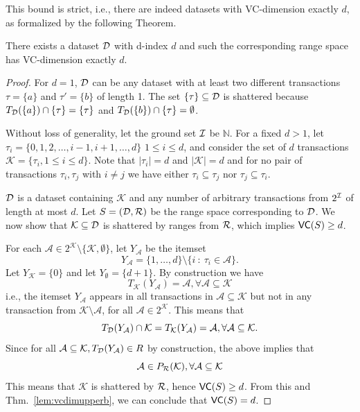 This bound is strict, i.e., there are indeed datasets with VC-dimension exactly
$d$, as formalized by the following Theorem.

\begin{theorem}\label{lem:vcdimlowerb}
  There exists a dataset ${\cal D}$ with d-index $d$ and such the corresponding range
  space has VC-dimension exactly $d$.
\end{theorem}

\begin{proof}
  For $d=1$, ${\cal D}$ can be any dataset with at least two different transactions
  $\tau=\{a\}$ and $\tau'=\{b\}$ of length 1. The set $\{\tau\}\subseteq{\cal D}$ is
  shattered because $T_{\cal D}(\{a\})\cap\{\tau\}=\{\tau\}$ and
  $T_{\cal D}(\{b\})\cap\{\tau\}=\emptyset$.

  Without loss of generality, let the ground set ${\cal I}$ be $\mathbb{N}$. For a
  fixed $d>1$, let $\tau_i=\{0,1,2,\dots,i-1,i+1,\dots,d\}$
  $1\le i\le d$, and consider the set of $d$ transactions $\mathcal{K}=\{\tau_i,
  1\le i\le d\}$.  Note that $|\tau_i|=d$ and $|\mathcal{K}|=d$ and for no pair
  of transactions $\tau_i,\tau_j$ with $i\neq j$ we have either
  $\tau_i\subseteq\tau_j$ nor $\tau_j\subseteq\tau_i$.
  
  ${\cal D}$ is a dataset containing $\mathcal{K}$ and any number of arbitrary
  transactions from $2^{\cal I}$ of length at most $d$. Let $S=({\cal D},\mathcal{R})$ be the range
  space corresponding to ${\cal D}$. We now show that $\mathcal{K}\subseteq {\cal D}$ is
  shattered by ranges from $\mathcal{R}$, which implies
  $\mathsf{VC}(S)\ge d$. 
  
  For each $\mathcal{A}\in 2^\mathcal{K}\setminus\{\mathcal{K},\emptyset\}$, let
  $Y_\mathcal{A}$ be the itemset 
  \[ 
  Y_\mathcal{A}=\{1,\dots,d\}\setminus \{i ~:~
  \tau_i \in \mathcal{A}\}.
  \]
  Let $Y_\mathcal{K}=\{0\}$ and let $Y_\emptyset=\{d+1\}$. By construction we
  have
  \[
  T_\mathcal{K}(Y_\mathcal{A})=\mathcal{A}, \forall \mathcal{A}\subseteq\mathcal{K}
  \]
  i.e., the itemset $Y_\mathcal{A}$ appears in all transactions in $\mathcal{A}\subseteq \mathcal{K}$
  but not in any transaction from $\mathcal{K}\setminus\mathcal{A}$, for all $\mathcal{A}\in 2^{\mathcal{K}}$. This means that
  \[
  T_{\cal D}(Y_\mathcal{A})\cap \mathcal{K} = T_\mathcal{K}(Y_\mathcal{A}) =
  \mathcal{A}, \forall \mathcal{A}\subseteq\mathcal{K}.
  \]
  Since for all $\mathcal{A}\subseteq\mathcal{K}, T_{\cal D}(Y_\mathcal{A})\in R$ by
  construction, the above implies that
  \[
  \mathcal{A}\in P_{\mathcal{R}}(\mathcal{K}), \forall \mathcal{A}\subseteq\mathcal{K}
  \]
  This means that $\mathcal{K}$ is shattered by $\mathcal{R}$, hence $\mathsf{VC}(S)\ge d$. From
  this and Thm.~\ref{lem:vcdimupperb}, we can conclude that $\mathsf{VC}(S)=d$.
\end{proof}


